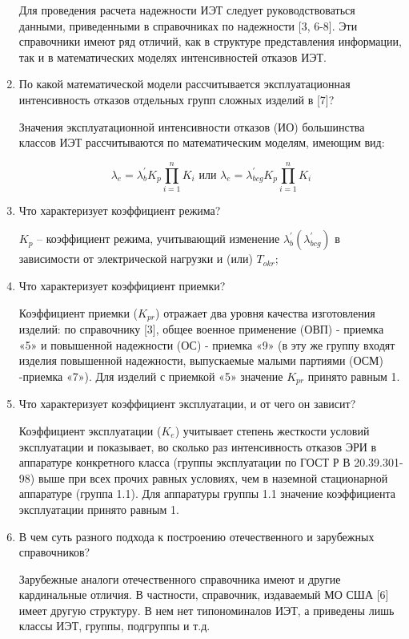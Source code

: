 \documentclass[a4paper,14pt]{article}
\begin{document}
\begin{enumerate}
Для проведения расчета надежности ИЭТ следует руководствоваться данными, приведенными в справочниках по надежности [3, 6-8]. 
Эти справочники имеют ряд отличий, как в структуре представления информации, так и в математических моделях интенсивностей отказов ИЭТ.

\item По какой математической модели рассчитывается эксплуатационная
интенсивность отказов отдельных групп сложных изделий в [7]?

Значения эксплуатационной интенсивности отказов (ИО) большинства
классов ИЭТ рассчитываются по математическим моделям, имеющим вид:

\begin{equation}
\lambda_{e} = \lambda_{b}^{'} K_p \prod_{i=1}^{n} K_i \text{~или~} \lambda_{e} = \lambda_{bcg}^{'} K_p \prod_{i=1}^{n} K_i
\end{equation}

\item Что характеризует коэффициент режима?

$K_p$ -- коэффициент режима, учитывающий изменение $\lambda_b^{'}(\lambda_{bcg}^{'})$ в зависимости от электрической нагрузки и (или)  $T_{okr}$; 

\item Что характеризует коэффициент приемки?

Коэффициент приемки ($K_{pr}$) отражает два уровня качества изготовления изделий: по справочнику [3], общее военное применение (ОВП) - приемка «5» и повышенной надежности (ОС) - приемка «9» (в эту же группу
входят изделия повышенной надежности, выпускаемые малыми партиями (ОСМ) -приемка «7»). Для изделий с приемкой «5» значение $K_{pr}$ принято равным 1.

\item Что характеризует коэффициент эксплуатации, и от чего он зависит?

Коэффициент эксплуатации ($K_{e}$) учитывает степень жесткости условий эксплуатации и показывает, во сколько раз интенсивность отказов ЭРИ в аппаратуре конкретного класса (группы эксплуатации по ГОСТ Р В 20.39.301-98) выше при всех прочих равных условиях, чем в наземной стационарной аппаратуре (группа 1.1). 
Для аппаратуры группы 1.1 значение коэффициента эксплуатации принято равным 1.

\item В чем суть разного подхода к построению отечественного и зарубежных справочников?

Зарубежные аналоги отечественного справочника имеют и другие кардинальные отличия. 
В частности, справочник, издаваемый МО США [6] имеет другую структуру. 
В нем нет типономиналов ИЭТ, а приведены лишь классы ИЭТ, группы, подгруппы и т.д.


\end{enumerate}
\end{document}
